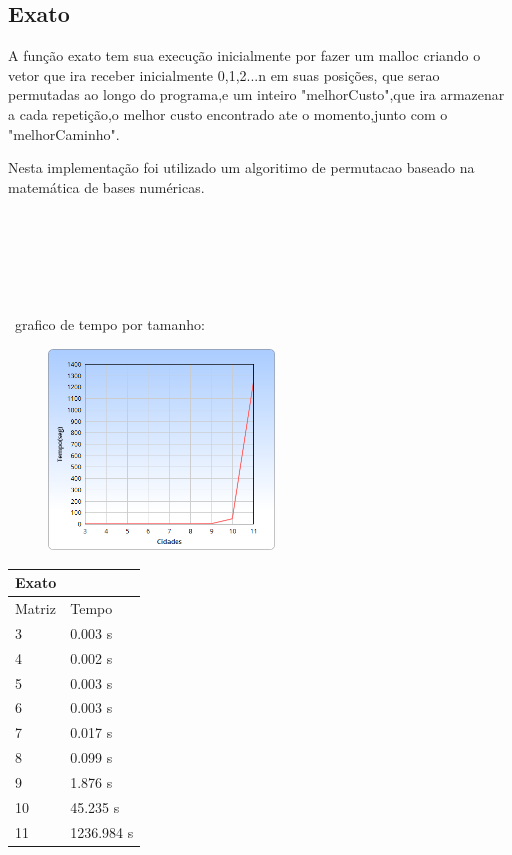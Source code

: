 \documentclass[a4paper,10pt]{article}
\begin{document}
 \subsection{Exato}
	 A função exato tem sua execução inicialmente por fazer um malloc criando o vetor que ira receber inicialmente 0,1,2...n em suas posições, que serao permutadas ao longo do programa,e um inteiro "melhorCusto",que ira armazenar a cada repetição,o melhor custo encontrado ate o momento,junto com o "melhorCaminho".
	 
Nesta implementação foi utilizado um algoritimo de permutacao baseado na matemática de bases numéricas.
\\\\\\\\\\\\\\\
grafico de tempo por tamanho:
 \begin{figure}[!htb]
   \includegraphics[width=6cm]{exato.png}
   \end{figure}
\begin{table}[ht]
\centering
\label{Exato}
\begin{tabular}{|ll|}
\hline
Exato                        &            \\ \hline
\multicolumn{1}{|l|}{Matriz} & Tempo      \\ \hline
\multicolumn{1}{|l|}{3}      & 0.003 s    \\ \hline
\multicolumn{1}{|l|}{4}      & 0.002 s    \\ \hline
\multicolumn{1}{|l|}{5}      & 0.003 s    \\ \hline
\multicolumn{1}{|l|}{6}      & 0.003 s    \\ \hline
\multicolumn{1}{|l|}{7}      & 0.017 s    \\ \hline
\multicolumn{1}{|l|}{8}      & 0.099 s    \\ \hline
\multicolumn{1}{|l|}{9}      & 1.876 s    \\ \hline
\multicolumn{1}{|l|}{10}     & 45.235 s   \\ \hline
\multicolumn{1}{|l|}{11}     & 1236.984 s \\ \hline
\end{tabular}
\end{table} 
   
\end{document}
